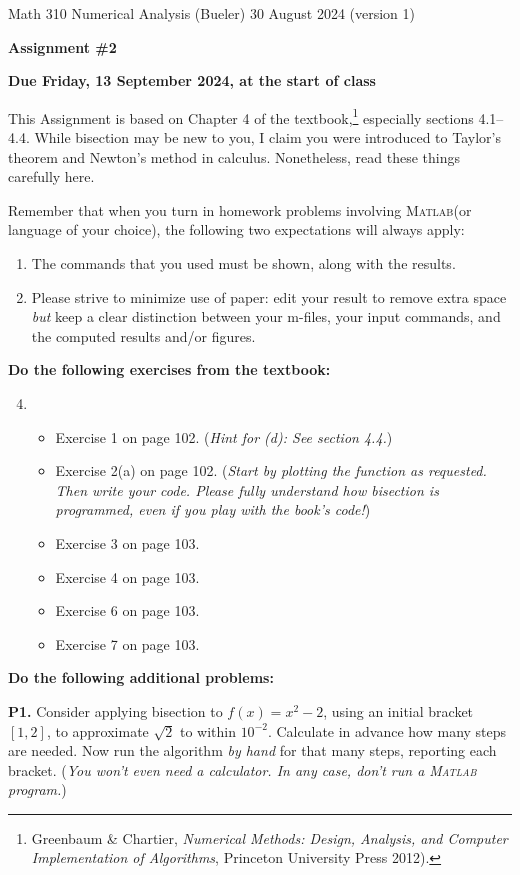 \documentclass[12pt]{amsart}
\newcommand{\Matlab}{\textsc{Matlab}\xspace}
\begin{document}
\scriptsize \noindent Math 310 Numerical Analysis (Bueler) \hfill 30 August 2024 (version 1)
\normalsize

\medskip\bigskip

\Large\centerline{\textbf{Assignment \#2}}
\large
\bigskip

\centerline{\textbf{Due Friday, 13 September 2024, at the start of class}}
\bigskip
\normalsize

\thispagestyle{empty}

This Assignment is based on Chapter 4 of the textbook,\footnote{Greenbaum \& Chartier, \emph{Numerical Methods: Design, Analysis, and Computer Implementation of Algorithms}, Princeton University Press 2012).}  especially sections 4.1--4.4.  While bisection may be new to you, I claim you were introduced to Taylor's theorem and Newton's method in calculus.  Nonetheless, read these things carefully here.

\bigskip
\noindent Remember that when you turn in homework problems involving \Matlab (or language of your choice), the following two expectations will always apply:
\renewcommand{\labelenumi}{\arabic{enumi}.\,}
\begin{enumerate}
\item The commands that you used must be shown, along with the results.
\item Please strive to minimize use of paper: edit your result to remove extra space \emph{but} keep a clear distinction between your m-files, your input commands, and the computed results and/or figures.
\end{enumerate}

\bigskip\bigskip
\noindent \textbf{Do the following exercises from the textbook:}

\medskip
\renewcommand{\labelenumi}{{\footnotesize\underline{\textsc{Chapter \arabic{enumi}}}}}
\begin{enumerate}
\setcounter{enumi}{3}
\item ~
    \begin{itemize}
    \item Exercise 1 on page 102.  (\emph{Hint for (d): See section 4.4.})
    \item Exercise 2(a) on page 102.  (\emph{Start by plotting the function as requested.  Then write your code.  Please fully understand how bisection is programmed, even if you play with the book's code!})
    \item Exercise 3 on page 103.
    \item Exercise 4 on page 103.
    \item Exercise 6 on page 103.
    \item Exercise 7 on page 103.
    \end{itemize}
\end{enumerate}

\bigskip\bigskip
\noindent \textbf{Do the following additional problems:}

\bigskip
\noindent \textbf{P1.}  Consider applying bisection to $f(x)=x^2-2$, using an initial bracket $[1,2]$, to approximate $\sqrt{2}$ to within $10^{-2}$.  Calculate in advance how many steps are needed.  Now run the algorithm \emph{by hand} for that many steps, reporting each bracket.  (\emph{You won't even need a calculator.  In any case, don't run a \Matlab program.})
\end{document}
